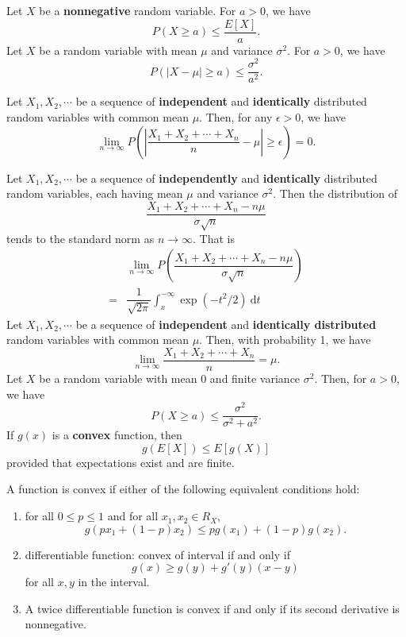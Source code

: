  Let \(X\) be a
\textbf{nonnegative} random variable. For \(a > 0\), we have 
\[P(X \geq a)\leq \dfrac{E[X]}{a}.\]
 Let \(X\) be a random variable
with mean \(\mu\) and variance \(\sigma^2\). For \(a > 0\), we have
\[P(|X-\mu| \geq a) \leq \dfrac{\sigma^2}{a^2}.\]

 Let \(X_1, X_2, \cdots\) be
a sequence of \textbf{independent} and \textbf{identically} distributed 
random variables with common mean \(\mu\). Then, for any \(\epsilon > 0\), we
have
\[\lim\limits_{n\rightarrow
    \infty}P\left(\left|\dfrac{X_1+X_2+\cdots+X_n}{n}-\mu\right|\geq
\epsilon\right) = 0.\]

 Let \(X_1, X_2, \cdots\) be a sequence of
\textbf{independently} and \textbf{identically} 
distributed random variables, each having mean \(\mu\) and variance
\(\sigma^2\). Then the distribution of 
\[\dfrac{X_1+X_2+\cdots+X_n-n\mu}{\sigma\sqrt{n}}\]
tends to the standard norm as \(n \rightarrow \infty\). That is 
\begin{align*}
&\lim\limits_{n\rightarrow
\infty}P\left(\dfrac{X_1+X_2+\cdots+X_n-n\mu}{\sigma\sqrt{n}}\right) \\ 
  =&\dfrac{1}{\sqrt{2\pi}}\int_{x}^{-\infty}\exp(-t^2/2)\ \mathrm{d}t
\end{align*}
 Let \(X_1, X_2, \cdots\)
be a sequence of \textbf{independent} and \textbf{identically distributed} random variables with
common mean \(\mu\). Then, with probability 1, we have
\[\lim\limits_{n\rightarrow\infty}\dfrac{X_1+X_2+\cdots+X_n}{n}=\mu.\]
 Let \(X\) be a
random variable with mean \(0\) and finite variance \(\sigma^2\). Then, for
\(a > 0\), we have
\[P(X \geq a) \leq \dfrac{\sigma^2}{\sigma^2+a^2}.\]
 If \(g(x)\) is a \textbf{convex}
function, then 
\[g(E[X]) \leq E[g(X)]\]
provided that expectations exist and are finite.

 A function is convex if either of the following
equivalent conditions hold:
\begin{enumerate}
  \item for all \(0 \leq p \leq 1\) and for all \(x_1, x_2 \in R_X\), 
    \[g(px_1 + (1-p)x_2)\leq pg(x_1) + (1-p)g(x_2).\]
  \item differentiable function: convex of interval if and only if 
    \[g(x) \geq g(y) + g'(y)(x-y)\]
    for all \(x, y\) in the interval.
  \item A twice differentiable function is convex if and only if its second
    derivative is nonnegative.
\end{enumerate}
